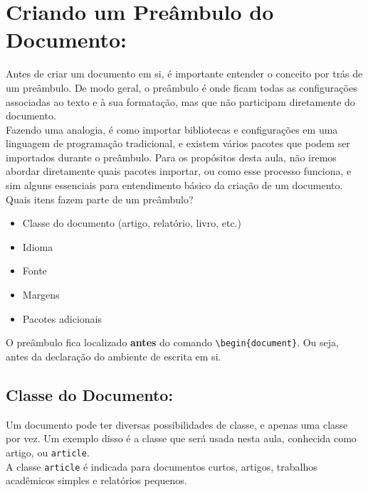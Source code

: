\documentclass{article}
\begin{document}
\begin{teX}
\end{teX}




\section{Criando um Preâmbulo do Documento:}

Antes de criar um documento em si, é importante entender o conceito por trás de um preâmbulo. De modo geral, o preâmbulo é onde ficam todas as configurações associadas ao texto e à sua formatação, mas que não participam diretamente do documento. \\

Fazendo uma analogia, é como importar bibliotecas e configurações em uma linguagem de programação tradicional, e existem vários pacotes que podem ser importados durante o preâmbulo. Para os propósitos desta aula, não iremos abordar diretamente quais pacotes importar, ou como esse processo funciona, e sim alguns essenciais para entendimento básico da criação de um documento. \\

Quais itens fazem parte de um preâmbulo?

\begin{itemize}
	\item Classe do documento (artigo, relatório, livro, etc.)
	\item Idioma
	\item Fonte
	\item Margens
	\item Pacotes adicionais
\end{itemize}

O preâmbulo fica localizado \textbf{antes} do comando \texttt{\textbackslash begin\{document\}}. Ou seja, antes da declaração do ambiente de escrita em si.

\subsection{Classe do Documento:}

Um documento pode ter diversas possibilidades de classe, e apenas uma classe por vez. Um exemplo disso é a classe que será usada nesta aula, conhecida como artigo, ou \texttt{article}. \\

A classe \texttt{article} é indicada para documentos curtos, artigos, trabalhos acadêmicos simples e relatórios pequenos.
\end{document}
